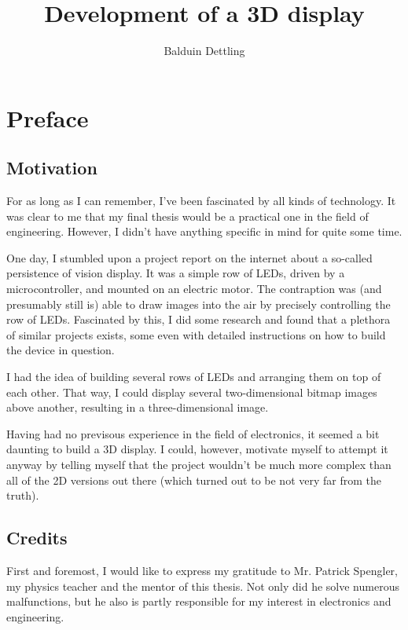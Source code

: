 \documentclass[a4paper, 11pt, titlepage]{report}
\begin{document}
\title{Development of a 3D display}
\author{Balduin Dettling}

\maketitle

\chapter*{Preface}


\section*{Motivation}

For as long as I can remember, I've been fascinated by all kinds of technology.
It was clear to me that my final thesis would be a practical one in the field of engineering.
However, I didn't have anything specific in mind for quite some time.

One day, I stumbled upon a project report on the internet about a so-called persistence of
vision display. It was a simple row of LEDs, driven by a microcontroller, and mounted on an
electric motor. The contraption was (and presumably still is) able to draw images into the
air by precisely controlling the row of LEDs. Fascinated by this, I did some research and
found that a plethora of similar projects exists, some even with detailed instructions on how
to build the device in question.

I had the idea of building several rows of LEDs and arranging them on top of each other.
That way, I could display several two-dimensional bitmap images above another, resulting in a
three-dimensional image.

Having had no previsous experience in the field of electronics, it seemed a bit daunting to
build a 3D display. I could, however, motivate myself to attempt it anyway by telling myself
that the project wouldn't be much more complex than all of the 2D versions out there (which
turned out to be not very far from the truth).


\section*{Credits}

First and foremost, I would like to express my gratitude to Mr. Patrick Spengler, my physics
teacher and the mentor of this thesis. Not only did he solve numerous malfunctions, but he also
is partly responsible for my interest in electronics and engineering.
\end{document}
